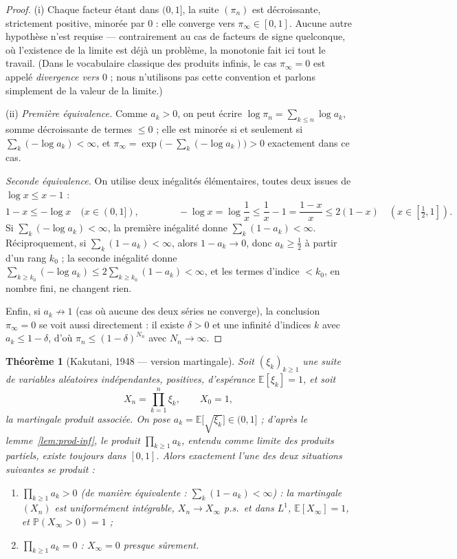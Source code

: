 \documentclass[11pt,a4paper]{article}
\theoremstyle{plain}
\newtheorem{theorem}{Théorème}[section]
\theoremstyle{definition}
\theoremstyle{remark}
\newcommand{\E}{\mathbb{E}}
\newcommand{\Prob}{\mathbb{P}}
\begin{document}
\begin{proof}
(i) Chaque facteur étant dans $(0,1]$, la suite $(\pi_n)$ est décroissante,
strictement positive, minorée par $0$ : elle converge vers
$\pi_\infty \in [0,1]$. Aucune autre hypothèse n'est requise --- contrairement
au cas de facteurs de signe quelconque, où l'existence de la limite est déjà
un problème, la monotonie fait ici tout le travail. (Dans le vocabulaire
classique des produits infinis, le cas $\pi_\infty = 0$ est appelé
\emph{divergence vers $0$} ; nous n'utilisons pas cette convention et parlons
simplement de la valeur de la limite.)

(ii) \emph{Première équivalence.} Comme $a_k > 0$, on peut écrire
$\log \pi_n = \sum_{k\le n} \log a_k$, somme décroissante de termes $\le 0$ ;
elle est minorée si et seulement si $\sum_k(-\log a_k) < \infty$, et
$\pi_\infty = \exp\bigl(-\sum_k(-\log a_k)\bigr) > 0$ exactement dans ce cas.

\emph{Seconde équivalence.} On utilise deux inégalités élémentaires, toutes
deux issues de $\log x \le x - 1$ :
\[
1 - x \le -\log x \quad (x \in (0,1]),
\qquad\qquad
-\log x = \log\frac1x \le \frac1x - 1 = \frac{1-x}{x} \le 2(1-x)
\quad (x \in [\tfrac12, 1]).
\]
Si $\sum_k(-\log a_k) < \infty$, la première inégalité donne
$\sum_k(1-a_k) < \infty$. Réciproquement, si $\sum_k (1-a_k) < \infty$, alors
$1 - a_k \to 0$, donc $a_k \ge \tfrac12$ à partir d'un rang $k_0$ ; la seconde
inégalité donne
$\sum_{k \ge k_0}(-\log a_k) \le 2\sum_{k\ge k_0}(1-a_k) < \infty$, et les
termes d'indice $< k_0$, en nombre fini, ne changent rien.

Enfin, si $a_k \not\to 1$ (cas où aucune des deux séries ne converge), la
conclusion $\pi_\infty = 0$ se voit aussi directement : il existe $\delta > 0$
et une infinité d'indices $k$ avec $a_k \le 1 - \delta$, d'où
$\pi_n \le (1-\delta)^{N_n}$ avec $N_n \to \infty$.
\end{proof}

\begin{theorem}[Kakutani, 1948 --- version martingale]\label{thm:kakutani-mart}
Soit $(\xi_k)_{k \ge 1}$ une suite de variables aléatoires indépendantes,
positives, d'espérance $\E[\xi_k] = 1$, et soit
\[
X_n = \prod_{k=1}^{n} \xi_k, \qquad X_0 = 1,
\]
la martingale produit associée. On pose
$a_k = \E\bigl[\sqrt{\xi_k}\bigr] \in (0,1]$ ; d'après le
lemme~\ref{lem:prod-inf}, le produit $\prod_{k\ge1} a_k$, entendu comme limite
des produits partiels, existe toujours dans $[0,1]$. Alors exactement l'une des
deux situations suivantes se produit :
\begin{enumerate}[label=(\Alph*)]
\item $\displaystyle\prod_{k\ge 1} a_k > 0$
      \emph{(de manière équivalente : $\sum_k (1-a_k) < \infty$)} :
      la martingale $(X_n)$ est uniformément intégrable, $X_n \to X_\infty$
      p.s.\ et dans $L^1$, $\E[X_\infty] = 1$, et $\Prob(X_\infty > 0) = 1$ ;
\item $\displaystyle\prod_{k\ge 1} a_k = 0$ :
      \quad $X_\infty = 0$ presque sûrement.
\end{enumerate}
\end{theorem}
\end{document}
